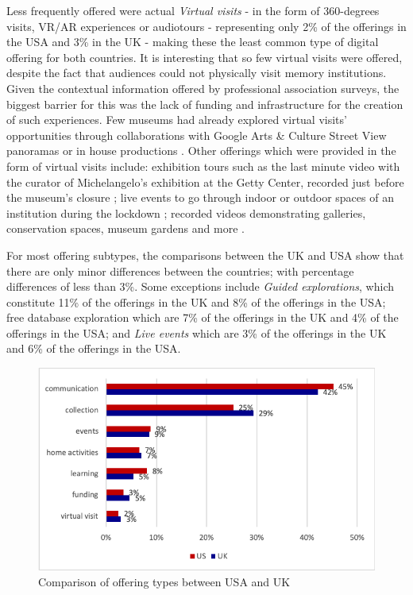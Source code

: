 \documentclass{egpubl}
\begin{document}
Less frequently offered were actual \textit{Virtual visits} - in the form of 360-degrees visits, VR/AR experiences or audiotours - representing only 2\% of the offerings in the USA and 3\% in the UK - making these the least common type of digital offering for both countries. It is interesting that so few virtual visits were offered, despite the fact that audiences could not physically visit memory institutions. Given the contextual information offered by professional association surveys, the biggest barrier for this was the lack of funding and infrastructure for the creation of such experiences. Few museums had already explored virtual visits' opportunities through collaborations with Google Arts \& Culture Street View panoramas \cite{GoogleArtsCulture,GoogleArtsCulturea} or in house productions \cite{FrankLloydWrightFoundation,BirminghamMuseumArtGallery}. Other offerings which were provided in the form of virtual visits include: exhibition tours such as the last minute video with the curator of Michelangelo's exhibition at the Getty Center, recorded just before the museum's closure \cite{getty2020}; live events to go through indoor or outdoor spaces of an institution during the lockdown \cite{VizcayaMuseumGardens}; recorded videos demonstrating galleries, conservation spaces, museum gardens and more \cite{Kew2020,ArchaeologyAlexandria2020}.
 

For most offering subtypes, the comparisons between the UK and USA show that there are only minor differences between the countries; with percentage differences of less than 3\%. Some exceptions include \emph{Guided explorations}, which constitute 11\% of the offerings in the UK and 8\% of the offerings in the USA; free database exploration which are 7\% of the offerings in the UK and 4\% of the offerings in the USA; and \emph{Live events} which are 3\% of the offerings in the UK and 6\% of the offerings in the USA.
 
\begin{figure}[h]
  \centering
  \includegraphics[width=\linewidth]{images/typeNEW.png}
  \caption{\label{fig:TypeComparisonUKUS}
           Comparison of offering types between USA and UK}
\end{figure}
\end{document}
